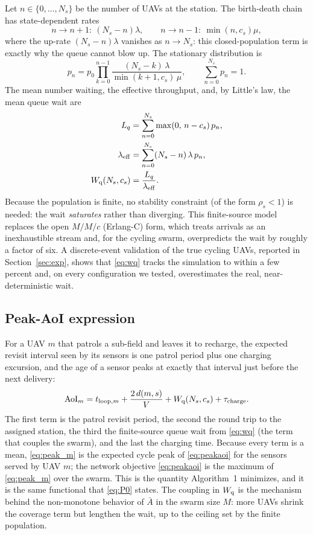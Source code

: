 Let $n\in\{0,\dots,N_s\}$ be the number of UAVs at the station. The birth-death
chain has state-dependent rates
\begin{equation}
  n\!\to\! n{+}1:\ (N_s-n)\lambda,
  \qquad
  n\!\to\! n{-}1:\ \min(n,c_s)\mu,
  \label{eq:rates}
\end{equation}
where the up-rate $(N_s-n)\lambda$ vanishes as $n\to N_s$: this closed-population
term is exactly why the queue cannot blow up. The stationary distribution is
\begin{equation}
  p_n = p_0\prod_{k=0}^{n-1}\frac{(N_s-k)\,\lambda}{\min(k{+}1,c_s)\,\mu},
  \qquad
  \sum_{n=0}^{N_s} p_n = 1.
  \label{eq:pn}
\end{equation}
The mean number waiting, the effective throughput, and, by Little's law, the mean
queue wait are
\begin{align}
  L_q &= \sum_{n=0}^{N_s}\max(0,\,n-c_s)\,p_n,
  \label{eq:lqlam}\\
  \lambda_{\mathrm{eff}} &= \sum_{n=0}^{N_s}(N_s-n)\,\lambda\,p_n,
  \nonumber\\
  W_{\mathrm q}(N_s,c_s) &= \frac{L_q}{\lambda_{\mathrm{eff}}}.
  \label{eq:wq}
\end{align}
Because the population is finite, no stability constraint (of the form
$\rho_s<1$) is needed: the wait \emph{saturates} rather than diverging. This
finite-source model replaces the open $M/M/c$ (Erlang-C) form, which treats
arrivals as an inexhaustible stream and, for the cycling swarm, overpredicts the
wait by roughly a factor of six. A discrete-event validation of the true cycling
UAVs, reported in Section~\ref{sec:exp}, shows that \eqref{eq:wq} tracks the
simulation to within a few percent and, on every configuration we tested, overestimates the real,
near-deterministic wait.

\subsection{Peak-AoI expression}
\label{subsec:aoi}
\label{subsec:peakaoi}
For a UAV $m$ that patrols a sub-field and leaves it to recharge, the expected revisit
interval seen by its sensors is one patrol period plus one charging excursion, and the
age of a sensor peaks at exactly that interval just before the next delivery:
\begin{equation}
  \mathrm{AoI}_m = t_{\mathrm{loop},m}
         + \frac{2\,d(m,s)}{V}
         + W_{\mathrm q}(N_s,c_s)
         + \tau_{\mathrm{charge}}.
  \label{eq:peak_m}
\end{equation}
The first term is the patrol revisit period, the second the round trip to the
assigned station, the third the finite-source queue wait from \eqref{eq:wq} (the
term that couples the swarm), and the last the charging time. Because every term is a
mean, \eqref{eq:peak_m} is the expected cycle peak of \eqref{eq:peakaoi} for the
sensors served by UAV $m$; the network objective \eqref{eq:peakaoi} is the maximum of
\eqref{eq:peak_m} over the swarm. This is the quantity Algorithm~1 minimizes, and it
is the same functional that \eqref{eq:P0} states. The
coupling in $W_{\mathrm q}$ is the mechanism behind the non-monotone behavior of
$\bar{A}$ in the swarm size $M$: more UAVs shrink the coverage term but lengthen
the wait, up to the ceiling set by the finite population.

